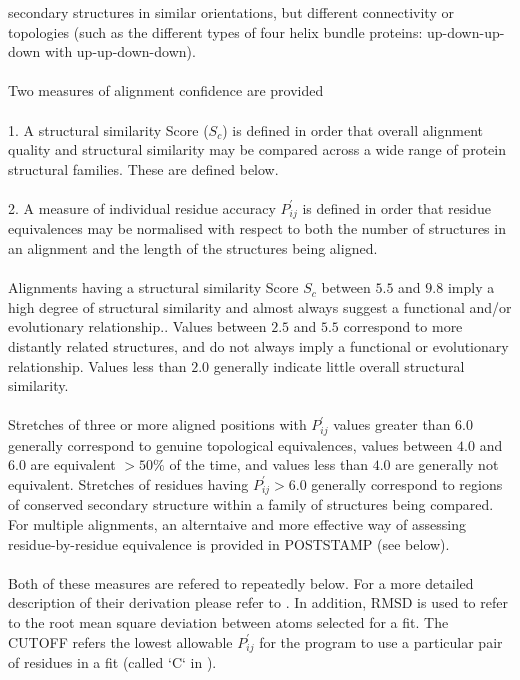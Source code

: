 secondary structures in similar orientations, but different
connectivity or topologies (such as the different types of four helix bundle
proteins: up-down-up-down with up-up-down-down).  \\
\\
Two measures of alignment confidence are provided \cite{rb92b}\\
\\
1. A structural similarity Score ($S_{c}$) is defined in order that
overall alignment quality and structural similarity may be compared
across a wide range of protein structural families.  These are defined below.\\
\\
2. A measure of individual residue accuracy $P_{ij}^{\prime}$ is 
defined in order that residue equivalences may be normalised with 
respect to both the number of structures in an alignment and the 
length of the structures being aligned.\\
\\
Alignments having a structural similarity Score $S_{c}$ between $5.5$ and
$9.8$ imply a high degree of structural similarity and almost always
suggest a functional and/or evolutionary relationship.. 
Values between $2.5$ and $5.5$ correspond to more distantly related
structures, and do not always imply a functional or evolutionary relationship.
Values less than $2.0$ generally indicate little overall structural similarity.\\
\\
Stretches of three or more aligned positions with $P_{ij}^{\prime}$ 
values greater than $6.0$ generally correspond to genuine topological 
equivalences, values between $4.0$ and $6.0$ are equivalent $> 50 \%$ of 
the time, and values less than $4.0$ are generally not equivalent.  
Stretches of residues having $P_{ij}^{\prime} > 6.0$ generally correspond to regions of 
conserved secondary structure within a family of structures being 
compared.  For multiple alignments, an alterntaive and more effective
way of assessing residue-by-residue equivalence is provided in POSTSTAMP (see below).\\
\\
Both of these measures are refered to repeatedly below.  For a more
detailed description of their derivation please refer to \cite{rb92b}.  
In addition, RMSD is used to refer to the root mean square 
deviation between atoms selected for a fit.  The CUTOFF refers the 
lowest allowable $P_{ij}^{\prime}$ for the program to use a particular 
pair of residues in a fit (called `C` in \cite{rb92b}).

